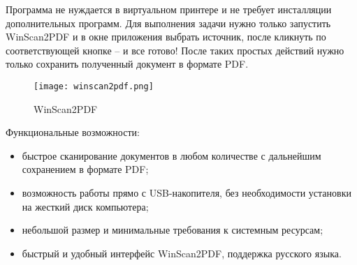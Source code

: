 Программа не нуждается в виртуальном принтере и не требует инсталляции дополнительных программ. Для выполнения задачи нужно только запустить WinScan2PDF и в окне приложения выбрать источник, после кликнуть по соответствующей кнопке – и все готово! После таких простых действий нужно только сохранить полученный документ в формате PDF.

\begin{figure}[h!]
	\centering
	\texttt{[image: winscan2pdf.png]}
	\caption{WinScan2PDF}
\end{figure}

Функциональные возможности:
\begin{itemize}
	\item быстрое сканирование документов в любом количестве с дальнейшим сохранением в формате PDF;
	\item возможность работы прямо с USB-накопителя, без необходимости установки на жесткий диск компьютера;
	\item небольшой размер и минимальные требования к системным ресурсам;
	\item быстрый и удобный интерфейс WinScan2PDF, поддержка русского языка.
\end{itemize}